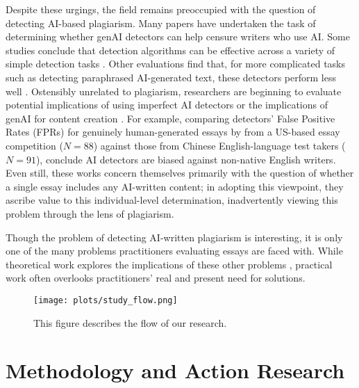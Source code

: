 Despite these urgings, the field remains preoccupied with the question of detecting AI-based plagiarism. Many papers have undertaken the task of determining whether genAI detectors can help censure writers who use AI. Some studies conclude that detection algorithms can be effective across a variety of simple detection tasks \cite{dugan_raid_2024,weber-wulff_testing_2023,tharindu_kumarage_stylometric_2023,elkhatat_evaluating_2023,mitchell_detectgpt_2023}. Other evaluations find that, for more complicated tasks such as detecting paraphrased AI-generated text, these detectors perform less well \cite{kalpesh_krishna_paraphrasing_2023}. Ostensibly unrelated to plagiarism, researchers are beginning to evaluate potential implications of using imperfect AI detectors \cite{liang_gpt_2023} or the implications of genAI for content creation \cite{kalpesh_krishna_paraphrasing_2023}. For example, comparing detectors' False Positive Rates (FPRs) for genuinely human-generated essays by from a US-based essay competition ($N = 88$) against those from Chinese English-language test takers ($N = 91$), \textcite{liang_gpt_2023} conclude AI detectors are biased against non-native English writers. Even still, these works concern themselves primarily with the question of whether a single essay includes any AI-written content; in adopting this viewpoint, they ascribe value to this individual-level determination, inadvertently viewing this problem through the lens of plagiarism.

Though the problem of detecting AI-written plagiarism is interesting, it is only one of the many problems practitioners evaluating essays are faced with. While theoretical work explores the implications of these other problems \cite{otterbacher_why_2023,yu_huang_reflection_2023}, practical work often overlooks practitioners' real and present need for solutions.

\begin{figure}[htbp]
  \centering
  \texttt{[image: plots/study\_flow.png]}
  \caption{This figure describes the flow of our research.}
  \label{fig:flow}
\end{figure}

\section{Methodology and Action Research}\label{sec:embedded}
